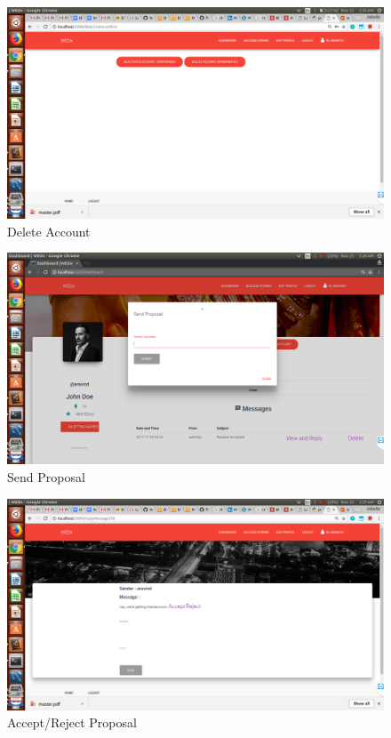 \documentclass[12pt]{report}
\begin{document}
\begin{figure}[!htb]
    \centering
    \includegraphics[width=1\textwidth]{sc-19.png}
    \caption{Delete Account}
    \label{fig:Delete Account}
\end{figure}

\begin{figure}[!htb]
    \centering
    \includegraphics[width=1\textwidth]{sc-20.png}
    \caption{Send Proposal}
    \label{fig:Send Proposal}
\end{figure}


\begin{figure}[!htb]
    \centering
    \includegraphics[width=1\textwidth]{sc-22.png}
    \caption{Accept/Reject Proposal}
    \label{fig:Accept/Reject Proposal}
\end{figure}
\end{document}

